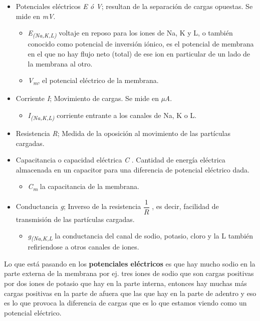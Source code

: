 \begin{itemize}
\item Potenciales eléctricos \emph{E ó  V}; resultan de la separación de cargas opuestas. Se mide en \emph{mV}.
    \begin{itemize}
     \item \emph{E\textsubscript{(Na,K,L)}} voltaje en reposo para los iones de Na, K y L, o también conocido como  potencial de inversión iónico, es el potencial de membrana en el que no hay flujo neto (total) de ese ion en particular de un lado de la membrana al otro. 
     \item \emph{V\textsubscript{m}}, el potencial eléctrico de la membrana. 
     \end{itemize}

\item Corriente \emph{I}; Movimiento de cargas. Se mide en \emph{µA}.
    \begin{itemize}
     \item \emph{I\textsubscript{(Na,K,L)}} corriente entrante a los canales de Na, K o L.
     \end{itemize}

\item Resistencia \emph{R}; Medida de la oposición al movimiento de las partículas cargadas.
\item Capacitancia o capacidad eléctrica \emph{C} . Cantidad de energía eléctrica almacenada en un capacitor para una diferencia de potencial eléctrico dada.
    \begin{itemize}
     \item \emph{C\textsubscript{m}} la capacitancia de la membrana. 
     \end{itemize}

\item Conductancia \emph{g}; Inverso de la resistencia \( \dfrac{1}{R} \) , es decir, facilidad de transmisión de las partículas cargadas.
    \begin{itemize}
     \item \emph{g\textsubscript{(Na,K,L}}  la conductancia del canal de sodio, potasio, cloro y la L también refiriendose a otros canales de iones. 
     \end{itemize}

\end{itemize}

Lo que está pasando en los \textbf{potenciales eléctricos} es que hay mucho sodio en la parte externa de la membrana por ej. tres iones de sodio que son cargas positivas por dos iones de potasio que hay en la parte interna, entonces hay muchas más cargas positivas en la parte de afuera que las que hay en la parte de adentro y eso es lo que provoca la diferencia de cargas que es lo que estamos viendo como un potencial eléctrico.



